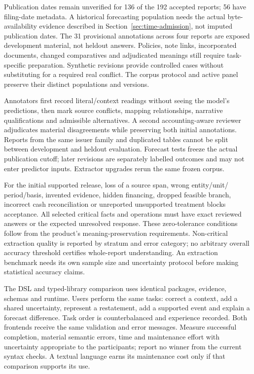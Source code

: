 Publication dates remain unverified for 136 of the 192 accepted reports; 56 have
filing-date metadata. A historical forecasting population needs the actual
byte-availability evidence described in Section~\ref{sec:time-admission},
not imputed publication dates. The 31 provisional annotations across four
reports are exposed development material, not heldout answers. Policies, note
links, incorporated documents, changed comparatives and adjudicated meanings
still require task-specific preparation. Synthetic revisions provide controlled
cases without substituting for a required real conflict. The corpus protocol
and active panel preserve their distinct populations and versions.

Annotators first record literal/context readings without seeing the model's
predictions, then mark source conflicts, mapping relationships, narrative
qualifications and admissible alternatives. A second accounting-aware reviewer
adjudicates material disagreements while preserving both initial annotations.
Reports from the same issuer family and duplicated tables cannot be split
between development and heldout evaluation. Forecast tests freeze the actual
publication cutoff; later revisions are separately labelled outcomes and may
not enter predictor inputs. Extractor upgrades rerun the same frozen corpus.

For the initial supported release, loss of a source span, wrong entity/unit/
period/basis, invented evidence, hidden financing, dropped feasible branch,
incorrect cash reconciliation or unreported unsupported treatment blocks
acceptance. All selected critical facts and operations must have exact
reviewed answers or the expected unresolved response. These zero-tolerance
conditions follow from the product's meaning-preservation requirements.
Non-critical extraction quality is reported by stratum and error category;
no arbitrary overall accuracy threshold certifies whole-report understanding.
An extraction benchmark needs its own sample size and uncertainty protocol
before making statistical accuracy claims.

The DSL and typed-library comparison uses identical packages, evidence,
schemas and runtime. Users perform the same tasks: correct a context, add a
shared uncertainty, represent a restatement, add a supported event and explain
a forecast difference. Task order is counterbalanced and experience recorded.
Both frontends receive the same validation and error messages. Measure
successful completion, material semantic errors, time and maintenance effort
with uncertainty appropriate to the participants; report no winner from the
current syntax checks. A textual language earns its maintenance cost only if
that comparison supports its use.

